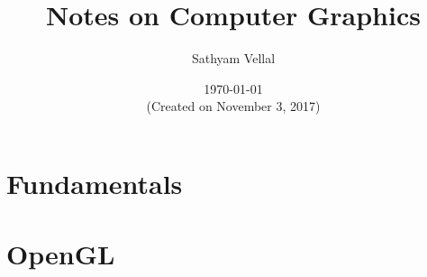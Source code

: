 \documentclass[11pt]{article}
\title{Notes on Computer Graphics}
\author{Sathyam Vellal}
\date{\today\\{\footnotesize (Created on November 3, 2017)}}
\let\origpagebreak\pagebreak
\renewcommand{\pagebreak}{\onecolumn\origpagebreak\twocolumn}
\begin{document}
\maketitle
\tableofcontents

\pagebreak
\section{Fundamentals}

\pagebreak
\section{OpenGL}
\end{document}

